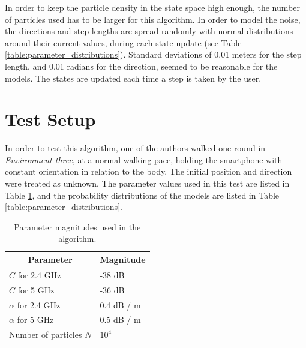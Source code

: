 \documentclass{LTHthesis}
\begin{document}
In order to keep the particle density in the state space high enough, the number of particles used has to be larger for this algorithm. In order to model the noise, the directions and step lengths are spread randomly with normal distributions around their current values, during each state update (see Table \ref{table:parameter_distributions}). Standard deviations of 0.01 meters for the step length, and 0.01 radians for the direction, seemed to be reasonable for the models. The states are updated each time a step is taken by the user. 

\section{Test Setup}

In order to test this algorithm, one of the authors walked one round in \emph{Environment three}, at a normal walking pace, holding the smartphone with constant orientation in relation to the body. The initial position and direction were treated as unknown. The parameter values used in this test are listed in Table \ref{table:parameters_careful_user_test}, and the probability distributions of the models are listed in Table \ref{table:parameter_distributions}.

\begin{table}[!hbt]
\begin{center}
\begin{tabular}{|l|l|}
\hline
\multicolumn{1}{|c|}{Parameter} & \multicolumn{1}{c|}{Magnitude} \\
\hline
\hline
$C$ for 2.4 GHz & -38 dB \\
\hline
$C$ for 5 GHz &         -36 dB\\
\hline
$\alpha$ for 2.4 GHz & 0.4 dB / m \\
\hline
$\alpha$ for 5 GHz & 0.5 dB / m \\
\hline 
Number of particles $N$ & $10^4$ \\
\hline 


\end{tabular}
\end{center}
\caption{Parameter magnitudes used in the algorithm.}\label{table:parameters_careful_user_test}
\end{table}
\end{document}
